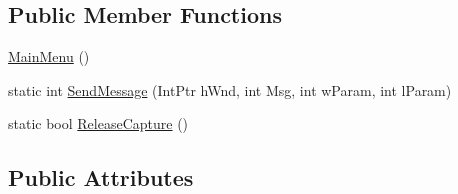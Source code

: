 \subsection*{Public Member Functions}
\begin{DoxyCompactItemize}
\item 
\hyperlink{class_health___assignment_1_1_main_menu_a1908bb977e055e870d00be0c3c91c5c1}{Main\+Menu} ()
\item 
static int \hyperlink{class_health___assignment_1_1_main_menu_a44c86004f90d336070e9b3ce44b5c0c3}{Send\+Message} (Int\+Ptr h\+Wnd, int Msg, int w\+Param, int l\+Param)
\item 
static bool \hyperlink{class_health___assignment_1_1_main_menu_a9a7f231efde52b96ed1508da0ae74a02}{Release\+Capture} ()
\end{DoxyCompactItemize}
\subsection*{Public Attributes}
